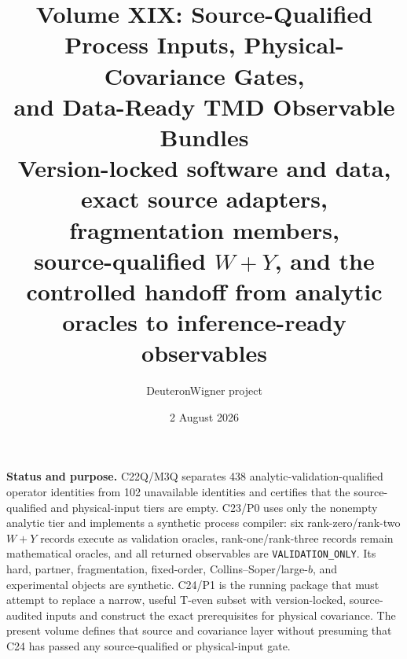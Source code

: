 \documentclass[11pt]{article}
\title{\vspace{-1.0cm}
{\color{navy}\bfseries Volume XIX: Source-Qualified Process Inputs, Physical-Covariance Gates,\\[2mm]
and Data-Ready TMD Observable Bundles}\\[4mm]
\large Version-locked software and data, exact source adapters, fragmentation members,\\
source-qualified \(W+Y\), and the controlled handoff from analytic oracles to inference-ready observables}
\author{DeuteronWigner project}
\date{2 August 2026}
\begin{document}
\maketitle

\begin{center}
\begin{minipage}{0.94\textwidth}
\colorbox{softblue}{\parbox{0.96\textwidth}{
\textbf{Status and purpose.}
C22Q/M3Q separates 438 analytic-validation-qualified operator identities from 102 unavailable identities and certifies that the source-qualified and physical-input tiers are empty.  C23/P0 uses only the nonempty analytic tier and implements a synthetic process compiler: six rank-zero/rank-two \(W+Y\) records execute as validation oracles, rank-one/rank-three records remain mathematical oracles, and all returned observables are \texttt{VALIDATION\_ONLY}.  Its hard, partner, fragmentation, fixed-order, Collins--Soper/large-\(b\), and experimental objects are synthetic.  C24/P1 is the running package that must attempt to replace a narrow, useful T-even subset with version-locked, source-audited inputs and construct the exact prerequisites for physical covariance.  The present volume defines that source and covariance layer without presuming that C24 has passed any source-qualified or physical-input gate.
}}
\end{minipage}
\end{center}
\end{document}

